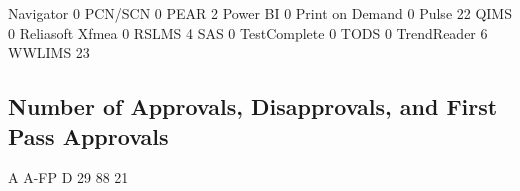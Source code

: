 \documentclass{article}
\begin{document}
\begin{Schunk}
\begin{Soutput}
                               Navigator 
                                       0 
                                 PCN/SCN 
                                       0 
                                    PEAR 
                                       2 
                                Power BI 
                                       0 
                         Print on Demand 
                                       0 
                                   Pulse 
                                      22 
                                    QIMS 
                                       0 
                         Reliasoft Xfmea 
                                       0 
                                   RSLMS 
                                       4 
                                     SAS 
                                       0 
                            TestComplete 
                                       0 
                                    TODS 
                                       0 
                             TrendReader 
                                       6 
                                  WWLIMS 
                                      23 
\end{Soutput}
\end{Schunk}

\subsection{Number of Approvals, Disapprovals, and First Pass Approvals}

\begin{Schunk}
\begin{Soutput}
   A A-FP    D 
  29   88   21 
\end{Soutput}
\end{Schunk}
\end{document}
